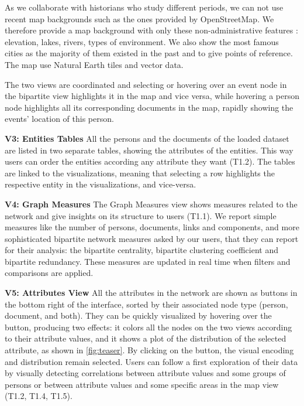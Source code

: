 As we collaborate with historians who study different periods, we can not use recent map backgrounds such as the ones provided by OpenStreetMap. We therefore provide a map background with only these non-administrative features : elevation, lakes, rivers, types of environment. We also show the most famous cities as the majority of them existed in the past and to give points of reference. The map use Natural Earth tiles and vector data.

The two views are coordinated and selecting or hovering over an event node in the bipartite view highlights it in the map and vice versa, while hovering a person node highlights all its corresponding documents in the map, rapidly showing the events' location of this person.

\noindent\textbf{V3: Entities Tables}
All the persons and the documents of the loaded dataset are listed in two separate tables, showing the attributes of the entities. This way users can order the entities according any attribute they want (T1.2). The tables are linked to the visualizations, meaning that selecting a row highlights the respective entity in the visualizations, and vice-versa.

\noindent\textbf{V4: Graph Measures}
The Graph Measures view shows measures related to the network and give insights on its structure to users (T1.1). We report simple measures like the number of persons, documents, links and components, and more sophisticated bipartite network measures asked by our users, that they can report for their analysis: the bipartite centrality, bipartite clustering coefficient and bipartite redundancy. These measures are updated in real time when filters and comparisons are applied.

\noindent\textbf{V5: Attributes View}
All the attributes in the network are shown as buttons in the bottom right of the interface, sorted by their associated node type (person, document, and both). They can be quickly visualized by hovering over the button, producing two effects: it colors all the nodes on the two views according to their attribute values, and it shows a plot of the distribution of the selected attribute, as shown in \autoref{fig:teaser}.
By clicking on the button, the visual encoding and distribution remain selected.
Users can follow a first exploration of their data by visually detecting correlations between attribute values and some groups of persons or between attribute values and some specific areas in the map view (T1.2, T1.4, T1.5).

